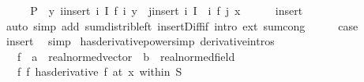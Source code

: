 \begin{isabellebody}
\ \ \isamarkupfalse%
\ \isamarkupfalse%
\ {\isachardoublequoteopen}{\isacharquery}{\kern0pt}P\ {\isacharequal}{\kern0pt}\ {\isacharparenleft}{\kern0pt}{\isasymlambda}y{\isachardot}{\kern0pt}\ {\isasymSum}i{\isacharprime}{\kern0pt}{\isasymin}insert\ i\ I{\isachardot}{\kern0pt}\ f{\isacharprime}{\kern0pt}\ i{\isacharprime}{\kern0pt}\ y\ {\isacharasterisk}{\kern0pt}\ {\isacharparenleft}{\kern0pt}{\isasymProd}j{\isasymin}insert\ i\ I\ {\isacharminus}{\kern0pt}\ {\isacharbraceleft}{\kern0pt}i{\isacharprime}{\kern0pt}{\isacharbraceright}{\kern0pt}{\isachardot}{\kern0pt}\ f\ j\ x{\isacharparenright}{\kern0pt}{\isacharparenright}{\kern0pt}{\isachardoublequoteclose}\isanewline
\ \ \ \ \isamarkupfalse%
\ insert{\isacharparenleft}{\kern0pt}{}{\isacharcomma}{\kern0pt}{}{\isacharparenright}{\kern0pt}\isanewline
\ \ \ \ \isamarkupfalse%
\ {\isacharparenleft}{\kern0pt}auto\ simp\ add{\isacharcolon}{\kern0pt}\ sum{\isacharunderscore}{\kern0pt}distrib{\isacharunderscore}{\kern0pt}left\ insert{\isacharunderscore}{\kern0pt}Diff{\isacharunderscore}{\kern0pt}if\ intro{\isacharbang}{\kern0pt}{\isacharcolon}{\kern0pt}\ ext\ sum{\isachardot}{\kern0pt}cong{\isacharparenright}{\kern0pt}\isanewline
\ \ \isamarkupfalse%
\ \isamarkupfalse%
\ {\isacharquery}{\kern0pt}case\isanewline
\ \ \ \ \isamarkupfalse%
\ insert\ \isamarkupfalse%
\ simp\isanewline
{}\isamarkupfalse%
%
\endisatagproof
{\isafoldproof}%
%
\isadelimproof
\isanewline
%
\endisadelimproof
\isanewline
{}\isamarkupfalse%
\ has{\isacharunderscore}{\kern0pt}derivative{\isacharunderscore}{\kern0pt}power{\isacharbrackleft}{\kern0pt}simp{\isacharcomma}{\kern0pt}\ derivative{\isacharunderscore}{\kern0pt}intros{\isacharbrackright}{\kern0pt}{\isacharcolon}{\kern0pt}\isanewline
\ \ \ f\ {\isacharcolon}{\kern0pt}{\isacharcolon}{\kern0pt}\ {\isachardoublequoteopen}{\isacharprime}{\kern0pt}a\ {\isacharcolon}{\kern0pt}{\isacharcolon}{\kern0pt}\ real{\isacharunderscore}{\kern0pt}normed{\isacharunderscore}{\kern0pt}vector\ {\isasymRightarrow}\ {\isacharprime}{\kern0pt}b\ {\isacharcolon}{\kern0pt}{\isacharcolon}{\kern0pt}\ real{\isacharunderscore}{\kern0pt}normed{\isacharunderscore}{\kern0pt}field{\isachardoublequoteclose}\isanewline
\ \ \ f{\isacharcolon}{\kern0pt}\ {\isachardoublequoteopen}{\isacharparenleft}{\kern0pt}f\ has{\isacharunderscore}{\kern0pt}derivative\ f{\isacharprime}{\kern0pt}{\isacharparenright}{\kern0pt}\ {\isacharparenleft}{\kern0pt}at\ x\ within\ S{\isacharparenright}{\kern0pt}{\isachardoublequoteclose}\isanewline

\end{isabellebody}
